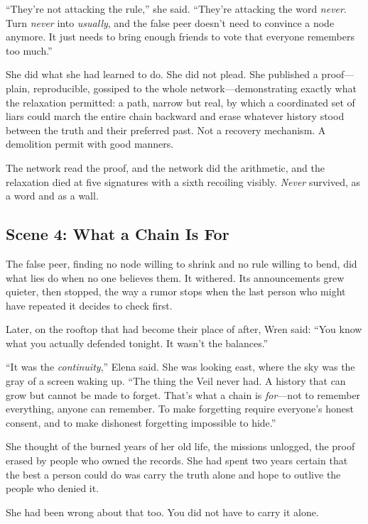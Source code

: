 ``They're not attacking the rule,'' she said. ``They're attacking the word
\emph{never}. Turn \emph{never} into \emph{usually}, and the false peer doesn't
need to convince a node anymore. It just needs to bring enough friends to vote
that everyone remembers too much.''

She did what she had learned to do. She did not plead. She published a
proof---plain, reproducible, gossiped to the whole network---demonstrating
exactly what the relaxation permitted: a path, narrow but real, by which a
coordinated set of liars could march the entire chain backward and erase whatever
history stood between the truth and their preferred past. Not a recovery
mechanism. A demolition permit with good manners.

The network read the proof, and the network did the arithmetic, and the
relaxation died at five signatures with a sixth recoiling visibly. \emph{Never}
survived, as a word and as a wall.

\hypertarget{scene-4-what-a-chain-is-for}{%
\subsection{Scene 4: What a Chain Is
For}\label{scene-4-what-a-chain-is-for}}

The false peer, finding no node willing to shrink and no rule willing to bend, did
what lies do when no one believes them. It withered. Its announcements grew
quieter, then stopped, the way a rumor stops when the last person who might have
repeated it decides to check first.

Later, on the rooftop that had become their place of after, Wren said: ``You know
what you actually defended tonight. It wasn't the balances.''

``It was the \emph{continuity},'' Elena said. She was looking east, where the sky
was the gray of a screen waking up. ``The thing the Veil never had. A history that
can grow but cannot be made to forget. That's what a chain is \emph{for}---not to
remember everything, anyone can remember. To make forgetting require everyone's
honest consent, and to make dishonest forgetting impossible to hide.''

She thought of the burned years of her old life, the missions unlogged, the proof
erased by people who owned the records. She had spent two years certain that the
best a person could do was carry the truth alone and hope to outlive the people
who denied it.

She had been wrong about that too. You did not have to carry it alone.

